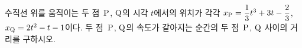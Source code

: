 수직선 위를 움직이는 두 점~$\mathrm{P}$, $\mathrm{Q}$의 시각 $t$에서의 위치가 각각 $x_{\mathrm{P}}=\dfrac{1}{3}t^3+3t-\dfrac{2}{3}$, $x_{\mathrm{Q}}=2t^2-t-1$이다. 두 점~$\mathrm{P}$, $\mathrm{Q}$의 속도가 같아지는 순간의 두 점~$\mathrm{P}$, $\mathrm{Q}$ 사이의 거리를 구하시오.
